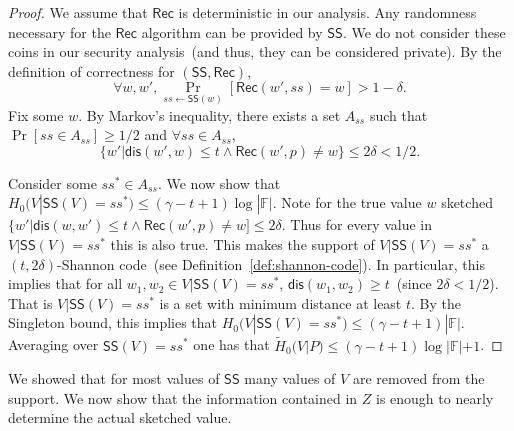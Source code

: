 \documentclass[11pt]{article}
\newcommand{\defref}[1]{\mbox{Definition~\ref{#1}}}
\newcommand{\class}[1]{{\ensuremath{\mathsf{#1}}}}
\newcommand{\sketch}{\ensuremath{\class{SS}}\xspace}
\newcommand{\rec}{\ensuremath{\class{Rec}}\xspace}
\newcommand{\dis}{\ensuremath{\mathsf{dis}}}
\begin{document}
\begin{proof}
We assume that $\rec$ is deterministic in our analysis.  Any randomness necessary for the \rec algorithm can be provided by \sketch.  We do not consider these coins in our security analysis~(and thus, they can be considered private).
By the definition of correctness for $(\sketch, \rec)$, 
\[
\forall w, w', \Pr_{ss\leftarrow \sketch(w)} [\rec(w', ss) = w] >1-\delta.
\]
Fix some $w$.  
By Markov's inequality, there exists a set $A_{ss}$ such that $\Pr[ss\in A_{ss}]\ge 1/2$ and $\forall ss\in A_{ss}$, 
\[
\{w' | \dis (w', w)\le t \wedge \rec(w', p) \neq w\}\le 2\delta < 1/2.\]

Consider some $ss^*\in A_{ss}$.  We now show that $H_0(V | \sketch(V) = ss^*) \le (\gamma-t+1)\log |\mathbb{F}|$.  Note for the true value $w$ sketched $\{w' | \dis(w, w') \le t \wedge \rec(w', p) \neq w] \le 2\delta$.  Thus for every value in $V|\sketch(V) = ss^*$ this is also true.  This makes the support of $V|\sketch(V)=ss^*$ a $(t, 2\delta)$-Shannon code~(see \defref{def:shannon-code}).  In particular, this implies that for all $w_1, w_2 \in V|\sketch(V)=ss^*$, $\dis(w_1, w_2)\ge t$~(since $2\delta< 1/2$).  That is $V|\sketch(V)=ss^*$ is a set with minimum distance at least $t$.  By the Singleton bound, this implies that $H_0(V |\sketch(V)=ss^*) \le (\gamma -t+1 )|\mathbb{F}|$.  Averaging over $\sketch(V)=ss^*$ one has that $\tilde{H}_0(V|P) \le (\gamma -t +1) \log|\mathbb{F}| +1$.
%
\end{proof}
We showed that for most values of $\sketch$ many values of $V$ are removed from the support.  We now show that the information contained in $Z$ is enough to nearly determine the actual sketched value.
\end{document}
